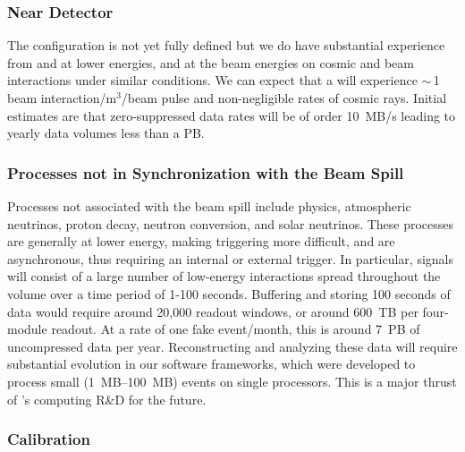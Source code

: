 \subsubsection{Near Detector} 

The  configuration is not yet fully defined  but we do have substantial experience from  and   at lower energies, and   at the   beam energies on cosmic and beam interactions under similar conditions.  We can expect that a  will experience $\sim\,$1 beam interaction/m$^3$/beam pulse and non-negligible rates of cosmic rays. Initial estimates are that zero-suppressed data rates will be of order \SI{10}{MB/s} leading to yearly data volumes less than a PB.  

\subsubsection{Processes not in Synchronization with the Beam Spill} 

Processes not associated with the beam spill %
include  physics, atmospheric neutrinos, proton decay, neutron conversion, and solar neutrinos.  These processes are generally at lower energy, making triggering more difficult, and are  asynchronous, thus requiring an internal or external trigger.  In particular,  signals will consist of a large number of low-energy interactions spread throughout the  volume over a time period of 1-100 seconds. Buffering and storing 100 seconds of data would require around 20,000 readout windows, or around \SI{600}{TB} per four-module  readout.  At a rate of one fake  event/month, this is around \SI{7}{PB} of uncompressed data per year.  Reconstructing and analyzing these data will require substantial evolution in our software frameworks, which were developed to process small (\SIrange{1}{100}{MB}) events on single processors. This is a major thrust of 's computing R\&D for the future. 

\subsubsection{
Calibration}

